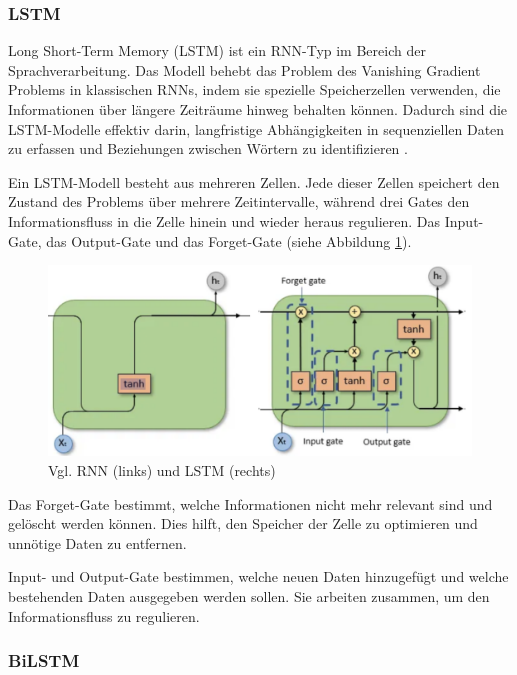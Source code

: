 \subsubsection{LSTM}

Long Short-Term Memory (LSTM) ist ein RNN-Typ im Bereich der Sprachverarbeitung. Das Modell behebt das Problem des 
Vanishing Gradient Problems in klassischen RNNs, indem sie spezielle Speicherzellen verwenden, die Informationen über 
längere Zeiträume hinweg behalten können.
Dadurch sind die LSTM-Modelle effektiv darin, langfristige Abhängigkeiten in sequenziellen Daten zu erfassen und
Beziehungen zwischen Wörtern zu identifizieren \cite{Deshai:2023aa}.

Ein LSTM-Modell besteht aus mehreren Zellen.
Jede dieser Zellen speichert den Zustand des Problems über mehrere Zeitintervalle, während drei Gates den 
Informationsfluss in die Zelle hinein und wieder heraus regulieren.
Das Input-Gate, das Output-Gate und das Forget-Gate \cite{berrajaa2022nlp} (siehe Abbildung \ref{fig:rnnvslstm}).

\begin{figure}[htbp]
    \begin{center}
    \includegraphics[scale=0.4]{static/RNNvsLSTM.png}
    \caption{\label{fig:rnnvslstm} Vgl. RNN (links) und LSTM (rechts) \cite{aiml2025sequence}}
    \end{center}
\end{figure}

Das Forget-Gate bestimmt, welche Informationen nicht mehr relevant sind und gelöscht werden können. 
Dies hilft, den Speicher der Zelle zu optimieren und unnötige Daten zu entfernen.

Input- und Output-Gate bestimmen, welche neuen Daten hinzugefügt und welche bestehenden 
Daten ausgegeben werden sollen. Sie arbeiten zusammen, um den Informationsfluss zu regulieren.

\subsubsection{BiLSTM}

